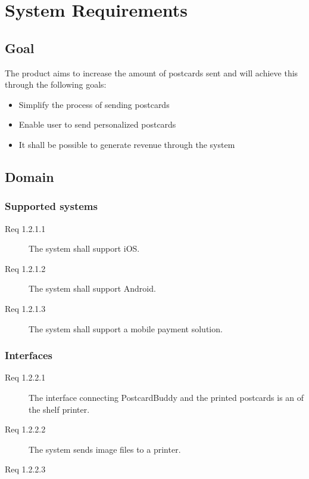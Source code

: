 \documentclass[10pt,a4paper]{article}
\begin{document}
\section{System Requirements}

\subsection{Goal}
The product aims to increase the amount of postcards sent and will achieve this through the following goals:
\begin{itemize}
\item Simplify the process of sending postcards
\item Enable user to send personalized postcards
\item It shall be possible to generate revenue through the system
\end{itemize}

\subsection{Domain}
\subsubsection{Supported systems}
\begin {description}
\item [Req 1.2.1.1] The system shall support iOS.
\item [Req 1.2.1.2] The system shall support Android.
\item [Req 1.2.1.3] The system shall support a mobile payment solution. 
\end{description}
\subsubsection{Interfaces}
\begin {description}
\item [Req 1.2.2.1] The interface connecting PostcardBuddy and the printed postcards is an of the shelf printer.
\item [Req 1.2.2.2] The system sends image files to a printer. 
\item [Req 1.2.2.3] 
\end{description}
\end{document}
